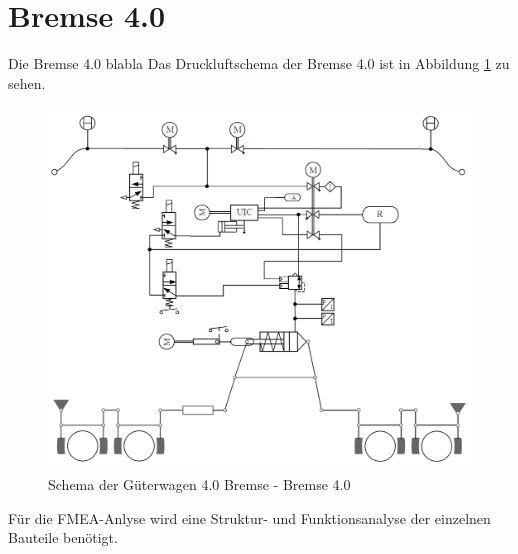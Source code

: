 \section{Bremse 4.0}
Die Bremse 4.0 blabla 
Das Druckluftschema der \gls{Bremse 4.0} ist in Abbildung \ref{fig:GW40Schema} zu sehen.\par
\begin{figure}[hbt]
    \centering
    \includegraphics[width=\textwidth]{Bilder/GW40Schema.PNG}
    \caption{Schema der Güterwagen 4.0 Bremse - Bremse 4.0}
    \label{fig:GW40Schema}
\end{figure}
Für die FMEA-Anlyse wird eine Struktur- und Funktionsanalyse der einzelnen Bauteile benötigt. 

